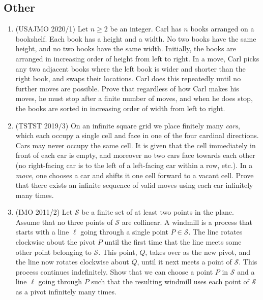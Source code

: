 \documentclass{article}
\begin{document}
\subsection{Other}
\begin{enumerate}
	\item (USAJMO 2020/1) Let $n \geq 2$ be an integer. Carl has $n$ books arranged on a bookshelf. Each book has a height and a width. No two books have the same height, and no two books have the same width. Initially, the books are arranged in increasing order of height from left to right. In a move, Carl picks any two adjacent books where the left book is wider and shorter than the right book, and swaps their locations. Carl does this repeatedly until no further moves are possible. Prove that regardless of how Carl makes his moves, he must stop after a finite number of moves, and when he does stop, the books are sorted in increasing order of width from left to right.

    \item (TSTST 2019/3) On an infinite square grid we place finitely many \textit{cars}, which each occupy a single cell and face in one of the four cardinal directions. Cars may never occupy the same cell. It is given that the cell immediately in front of each car is empty, and moreover no two cars face towards each other (no right-facing car is to the left of a left-facing car within a row, etc.). In a \textit{move}, one chooses a car and shifts it one cell forward to a vacant cell. Prove that there exists an infinite sequence of valid moves using each car infinitely many times.
    
    \item (IMO 2011/2) Let $\mathcal{S}$ be a finite set of at least two points in the plane. Assume that no three points of $\mathcal S$ are collinear. A windmill is a process that starts with a line $\ell$ going through a single point $P \in \mathcal S$. The line rotates clockwise about the pivot $P$ until the first time that the line meets some other point belonging to $\mathcal S$. This point, $Q$, takes over as the new pivot, and the line now rotates clockwise about $Q$, until it next meets a point of $\mathcal S$. This process continues indefinitely. Show that we can choose a point $P$ in $\mathcal S$ and a line $\ell$ going through $P$ such that the resulting windmill uses each point of $\mathcal S$ as a pivot infinitely many times.
\end{enumerate}
\end{document}
